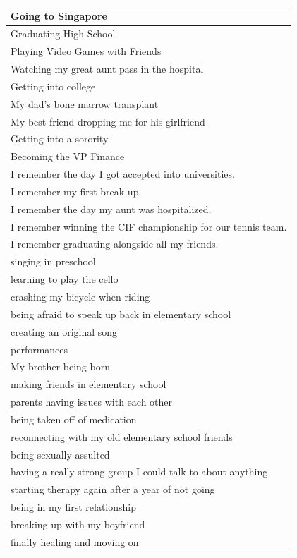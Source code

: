 \documentclass[
  .7em,
  letterpaper,
  DIV=11,
  numbers=noendperiod]{scrartcl}
\begin{document}
\begin{table}
\begin{tabular}{l}
\hline
Going to Singapore\\
\hline
Graduating High School\\
\hline
Playing Video Games with Friends\\
\hline
Watching my great aunt pass in the hospital\\
\hline
Getting into college\\
\hline
My dad's bone marrow transplant\\
\hline
My best friend dropping me for his girlfriend\\
\hline
Getting into a sorority\\
\hline
Becoming the VP Finance\\
\hline
I remember the day I got accepted into universities.\\
\hline
I remember my first break up.\\
\hline
I remember the day my aunt was hospitalized.\\
\hline
I remember winning the CIF championship for our tennis team.\\
\hline
I remember graduating alongside all my friends.\\
\hline
singing in preschool\\
\hline
learning to play the cello\\
\hline
crashing my bicycle when riding\\
\hline
being afraid to speak up back in elementary school\\
\hline
creating an original song\\
\hline
performances\\
\hline
My brother being born\\
\hline
making friends in elementary school\\
\hline
parents having issues with each other\\
\hline
being taken off of medication\\
\hline
reconnecting with my old elementary school friends\\
\hline
being sexually assulted\\
\hline
having a really strong group I could talk to about anything\\
\hline
starting therapy again after a year of not going\\
\hline
being in my first relationship\\
\hline
breaking up with my boyfriend\\
\hline
finally healing and moving on\\
\hline

\end{tabular}
\end{table}
\end{document}
